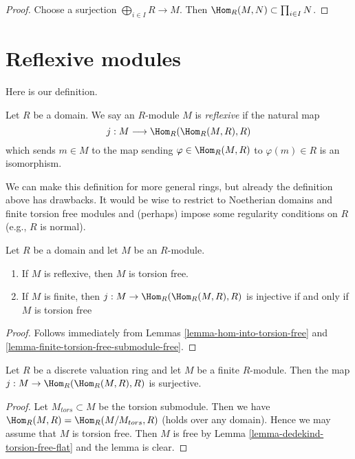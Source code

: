 \begin{proof}
Choose a surjection $\bigoplus_{i \in I} R \to M$.
Then $\Hom_R(M, N) \subset \prod_{i \in I} N$.
\end{proof}




\section{Reflexive modules}
\label{section-reflexive}

\noindent
Here is our definition.

\begin{definition}
\label{definition-reflexive}
Let $R$ be a domain. We say an $R$-module $M$ is {\it reflexive} if
the natural map
$$
j : M \longrightarrow \Hom_R(\Hom_R(M, R), R)
$$
which sends $m \in M$ to the map sending $\varphi \in \Hom_R(M, R)$
to $\varphi(m) \in R$ is an isomorphism.
\end{definition}

\noindent
We can make this definition for more general rings, but already the
definition above has drawbacks. It would be wise to restrict
to Noetherian domains and finite torsion free modules and (perhaps)
impose some regularity conditions on $R$ (e.g., $R$ is normal).

\begin{lemma}
\label{lemma-reflexive-torsion-free}
Let $R$ be a domain and let $M$ be an $R$-module.
\begin{enumerate}
\item If $M$ is reflexive, then $M$ is torsion free.
\item If $M$ is finite, then $j : M \to \Hom_R(\Hom_R(M, R), R)$ is injective
if and only if $M$ is torsion free
\end{enumerate}
\end{lemma}

\begin{proof}
Follows immediately from Lemmas \ref{lemma-hom-into-torsion-free} and
\ref{lemma-finite-torsion-free-submodule-free}.
\end{proof}

\begin{lemma}
\label{lemma-cokernel-map-double-dual-dvr}
Let $R$ be a discrete valuation ring and let $M$ be a finite $R$-module.
Then the map $j : M \to \Hom_R(\Hom_R(M, R), R)$ is surjective.
\end{lemma}

\begin{proof}
Let $M_{tors} \subset M$ be the torsion submodule. Then we have
$\Hom_R(M, R) = \Hom_R(M/M_{tors}, R)$ (holds over any domain).
Hence we may assume that $M$ is torsion free. Then $M$ is free
by Lemma \ref{lemma-dedekind-torsion-free-flat} and the lemma is clear.
\end{proof}

